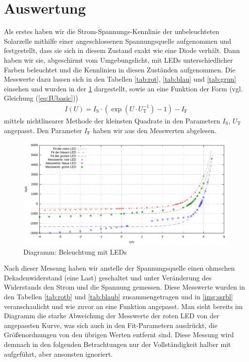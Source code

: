 \documentclass[numbers=noenddot,12pt,a4paper]{scrartcl}
\newcommand{\ix}[1]{_\text{#1}}
\begin{document}
\section{Auswertung}
Als erstes haben wir die Strom-Spannungs-Kennlinie der unbeleuchteten Solarzelle mithilfe einer angeschlossenen Spannungsquelle aufgenommen und festgestellt, dass sie sich in diesem Zustand exakt wie eine Diode verhält. Dann haben wir sie, abgeschirmt vom Umgebungslicht, mit LEDs unterschiedlicher Farben beleuchtet und die Kennlinien in diesen Zuständen aufgenommen. Die Messwerte dazu lassen sich in den Tabellen \ref{tab:rot}, \ref{tab:blau} und \ref{tab:grun} einsehen und wurden in der \ref{img:ssrl} dargestellt, sowie an eine Funktion der Form (vgl. Gleichung (\ref{eq:IUbasic}))
\begin{align}
I(U)=I\ix{S}\cdot\left(\exp\left(U\cdot U\ix{T}^{-1}\right)-1\right)-I\ix{F}\label{eq:IUenhanced}
\end{align}
mittels nichtlinearer Methode der kleinsten Quadrate in den Parametern $I\ix{S}$, $U\ix{T}$ angepasst. Den Parameter $I\ix{F}$ haben wir aus den Messwerten abgelesen.
\begin{figure}[H]
	\includegraphics[width=1\textwidth]{messwerte/stromspannungspannungsrichtigled.pdf}
	\vspace{-2em}
	\caption{Diagramm: Beleuchtung mit LEDs} \label{img:ssrl}
\end{figure}
Nach dieser Messung haben wir anstelle der Spannungsquelle einen ohmschen Dekadenwiderstand (eine Last) geschaltet und unter Veränderung des Widerstands den Strom und die Spannung gemessen. Diese Messwerte wurden in den Tabellen \ref{tab:rotb} und \ref{tab:blaub} zusammengetragen und in \ref{img:ssrbl} veranschaulicht und wie zuvor an eine Funktion angepasst. Man sieht bereits im Diagramm die starke Abweichung der Messwerte der roten LED von der angepassten Kurve, was sich auch in den Fit-Parametern ausdrückt, die Größenordnungen von den übrigen Werten entfernt sind. Diese Messung wird demnach in den folgenden Betrachtungen nur der Vollständigkeit halber mit aufgeführt, aber ansonsten ignoriert.
\end{document}
